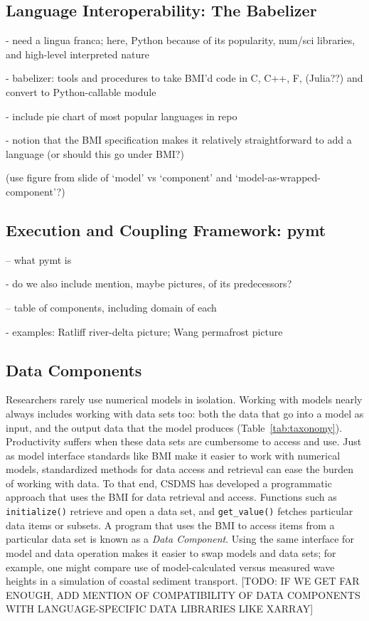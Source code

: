 \documentclass[12pt]{amsart}
\begin{document}
\subsection{Language Interoperability: The Babelizer}

- need a lingua franca; here, Python because of its popularity, num/sci libraries, and high-level interpreted nature

- babelizer: tools and procedures to take BMI'd code in C, C++, F, (Julia??) and convert to Python-callable module

- include pie chart of most popular languages in repo

- notion that the BMI specification makes it relatively straightforward to add a language (or should this go under BMI?)

(use figure from slide of `model' vs `component' and `model-as-wrapped-component'?)

\subsection{Execution and Coupling Framework: pymt}

-- what pymt is

- do we also include mention, maybe pictures, of its predecessors?

-- table of components, including domain of each

- examples: Ratliff river-delta picture; Wang permafrost picture

\subsection{Data Components}

Researchers rarely use numerical models in isolation. Working with models nearly always includes working with data sets too: both the data that go into a model as input, and the output data that the model produces (Table~\ref{tab:taxonomy}). Productivity suffers when these data sets are cumbersome to access and use. Just as model interface standards like BMI make it easier to work with numerical models, standardized methods for data access and retrieval can ease the burden of working with data. To that end, CSDMS has developed a programmatic approach that uses the BMI for data retrieval and access. Functions such as \texttt{initialize()} retrieve and open a data set, and \texttt{get\_value()} fetches particular data items or subsets. A program that uses the BMI to access items from a particular data set is known as a \textit{Data Component}. Using the same interface for model and data operation makes it easier to swap models and data sets; for example, one might compare use of model-calculated versus measured wave heights in a simulation of coastal sediment transport. [TODO: IF WE GET FAR ENOUGH, ADD MENTION OF COMPATIBILITY OF DATA COMPONENTS WITH LANGUAGE-SPECIFIC DATA LIBRARIES LIKE XARRAY]
\end{document}

